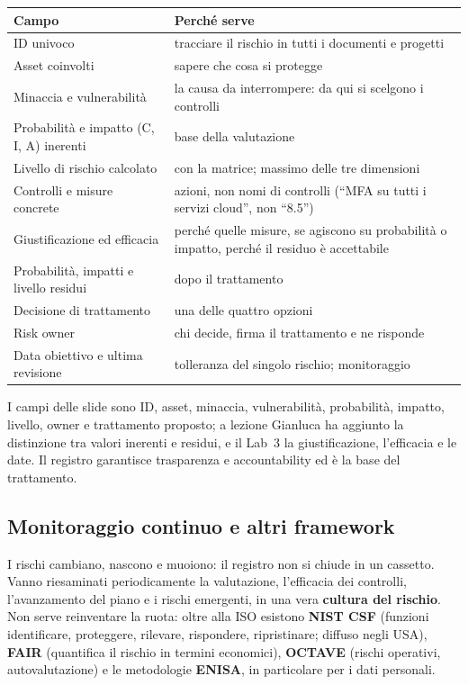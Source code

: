 \begin{center}
\small
\begin{tabularx}{\linewidth}{>{\raggedright\arraybackslash}p{4.2cm} X}
\toprule
\textbf{Campo} & \textbf{Perché serve}\\
\midrule
ID univoco & tracciare il rischio in tutti i documenti e progetti\\
Asset coinvolti & sapere che cosa si protegge\\
Minaccia e vulnerabilità & la causa da interrompere: da qui si scelgono i controlli\\
Probabilità e impatto (C, I, A) inerenti & base della valutazione\\
Livello di rischio calcolato & con la matrice; massimo delle tre dimensioni\\
Controlli e misure concrete & azioni, non nomi di controlli (``MFA su tutti i servizi cloud'', non ``8.5'')\\
Giustificazione ed efficacia & perché quelle misure, se agiscono su probabilità o impatto, perché il residuo
  è accettabile\\
Probabilità, impatti e livello residui & dopo il trattamento\\
Decisione di trattamento & una delle quattro opzioni\\
Risk owner & chi decide, firma il trattamento e ne risponde\\
Data obiettivo e ultima revisione & tolleranza del singolo rischio; monitoraggio\\
\bottomrule
\end{tabularx}
\end{center}
\noindent I campi delle slide sono ID, asset, minaccia, vulnerabilità, probabilità, impatto, livello, owner e
trattamento proposto; a lezione Gianluca ha aggiunto la distinzione tra valori inerenti e residui, e il Lab~3
la giustificazione, l'efficacia e le date. Il registro garantisce trasparenza e accountability ed è la base
del trattamento.

\subsection{Monitoraggio continuo e altri framework}
I rischi cambiano, nascono e muoiono: il registro non si chiude in un cassetto. Vanno riesaminati
periodicamente la valutazione, l'efficacia dei controlli, l'avanzamento del piano e i rischi emergenti, in
una vera \textbf{cultura del rischio}. Non serve reinventare la ruota: oltre alla ISO esistono
\textbf{NIST CSF} (funzioni identificare, proteggere, rilevare, rispondere, ripristinare; diffuso negli USA),
\textbf{FAIR} (quantifica il rischio in termini economici), \textbf{OCTAVE} (rischi operativi,
autovalutazione) e le metodologie \textbf{ENISA}, in particolare per i dati personali.

